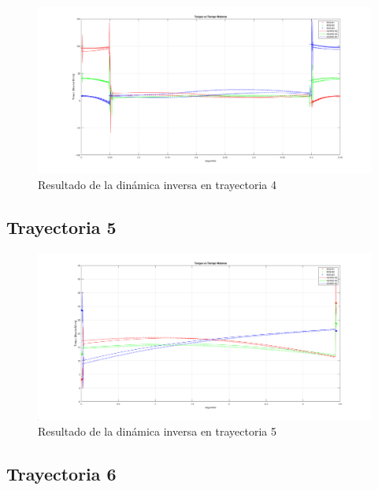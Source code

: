         \begin{figure}[h]
            \centering
            \includegraphics[width=1.0\linewidth]{Main/Chapter7/Images7/4.png}
            \caption{Resultado de la dinámica inversa en trayectoria 4}
            \label{f:cap7_tray4}
        \end{figure}
        
        \newpage
        
    \subsection{Trayectoria 5}
    
        \begin{figure}[h]
            \centering
            \includegraphics[width=1.0\linewidth]{Main/Chapter7/Images7/5.png}
            \caption{Resultado de la dinámica inversa en trayectoria 5}
            \label{f:cap7_tray5}
        \end{figure}
                
    \subsection{Trayectoria 6}
    

